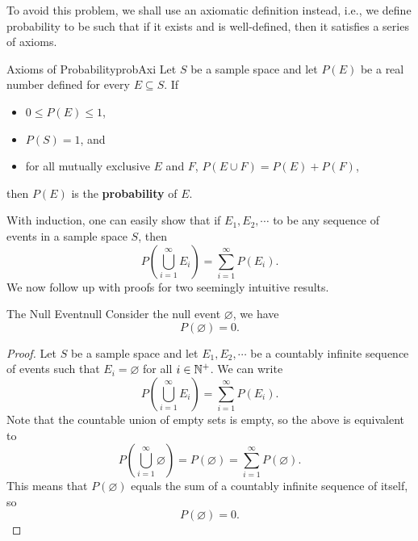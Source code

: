 \documentclass[math]{amznotes}
\theoremstyle{remark}
\begin{document}
To avoid this problem, we shall use an axiomatic definition instead, i.e., we define probability to be such that if it exists and is well-defined, then it satisfies a series of axioms. 
\begin{dfnbox}{Axioms of Probability}{probAxi}
    Let $S$ be a sample space and let $P(E)$ be a real number defined for every $E \subseteq S$. If
    \begin{itemize}
        \item $0 \leq P(E) \leq 1$,
        \item $P(S) = 1$, and
        \item for all mutually exclusive $E$ and $F$, $P(E \cup F) = P(E) + P(F)$,
    \end{itemize}
    then $P(E)$ is the {\color{red} \textbf{probability}} of $E$.
\end{dfnbox}
With induction, one can easily show that if $E_1, E_2, \cdots$ to be any sequence of events in a sample space $S$, then
\begin{equation*}
    P\left(\bigcup_{i = 1}^\infty E_i\right) = \sum_{i = 1}^{\infty}P(E_i).
\end{equation*}
We now follow up with proofs for two seemingly intuitive results.
\begin{thmbox}{The Null Event}{null}
    Consider the null event $\varnothing$, we have
    \begin{equation*}
        P(\varnothing) = 0.
    \end{equation*}
    \tcblower   
    \begin{proof}
        Let $S$ be a sample space and let $E_1, E_2, \cdots$ be a countably infinite sequence of events such that $E_i = \varnothing$ for all $i \in \mathbb{N}^+$. We can write
        \begin{equation*}
            P\left(\bigcup_{i = 1}^\infty E_i\right) = \sum_{i = 1}^{\infty}P(E_i).
        \end{equation*}
        Note that the countable union of empty sets is empty, so the above is equivalent to
        \begin{equation*}
            P\left(\bigcup_{i = 1}^\infty \varnothing\right) = P(\varnothing) = \sum_{i = 1}^{\infty}P(\varnothing).
        \end{equation*}
        This means that $P(\varnothing)$ equals the sum of a countably infinite sequence of itself, so 
        \begin{equation*}
            P(\varnothing) = 0.
        \end{equation*}
    \end{proof} 
\end{thmbox}
\end{document}
